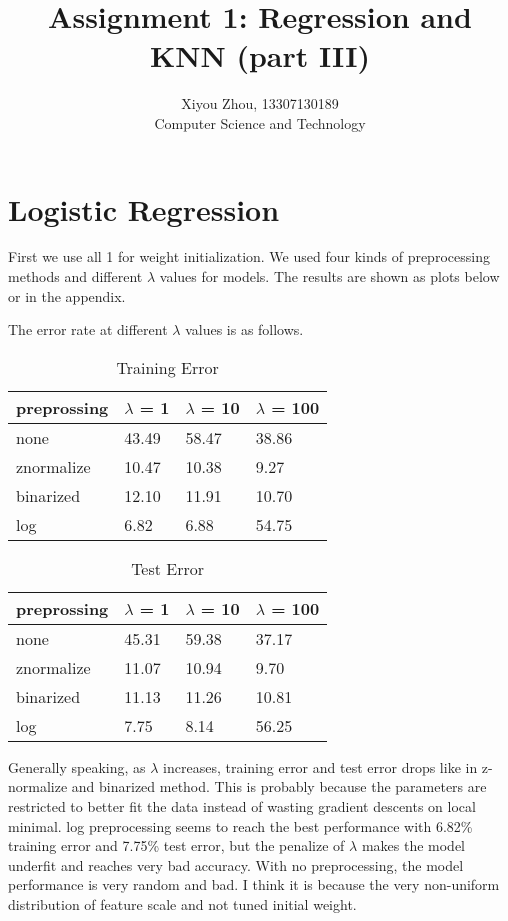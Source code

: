 \documentclass[11pt, oneside]{article}
\begin{document}
\title{Assignment 1: Regression and KNN (part III)}
\author{Xiyou Zhou, 13307130189 \\ Computer Science and Technology}
\maketitle

\section{Logistic Regression}
First we use all 1 for weight initialization. We used four kinds of preprocessing methods and different $\lambda$ values for models. The results are shown as plots below or in the appendix.

The error rate at different $\lambda$ values is as follows.

\begin{table}[h]
\centering
\caption{Training Error}
\begin{tabular}{l|lll}
\hline
preprossing & $\lambda$ = 1     & $\lambda$ = 10    & $\lambda$ = 100   \\
\hline
none       & 43.49 & 58.47 & 38.86 \\
znormalize & 10.47 & 10.38 & 9.27  \\
binarized  & 12.10 & 11.91 & 10.70 \\
log        & 6.82  & 6.88  & 54.75 \\
\hline
\end{tabular}
\end{table}

\begin{table}[h]
\centering
\caption{Test Error}
\begin{tabular}{l|lll}
\hline
preprossing & $\lambda$ = 1     & $\lambda$ = 10    & $\lambda$ = 100   \\
\hline
none       & 45.31 & 59.38 & 37.17 \\
znormalize & 11.07 & 10.94 & 9.70  \\
binarized  & 11.13 & 11.26 & 10.81 \\
log        & 7.75  & 8.14  & 56.25 \\
\hline
\end{tabular}
\end{table}

Generally speaking, as $\lambda$ increases, training error and test error drops like in z-normalize and binarized method. This is probably because the parameters are restricted to better fit the data instead of wasting gradient descents on local minimal. log preprocessing seems to reach the best performance with 6.82\% training error and 7.75\% test error, but the penalize of $\lambda$ makes the model underfit and reaches very bad accuracy. With no preprocessing, the model performance is very random and bad. I think it is because the very non-uniform distribution of feature scale and not tuned initial weight.
\end{document}
